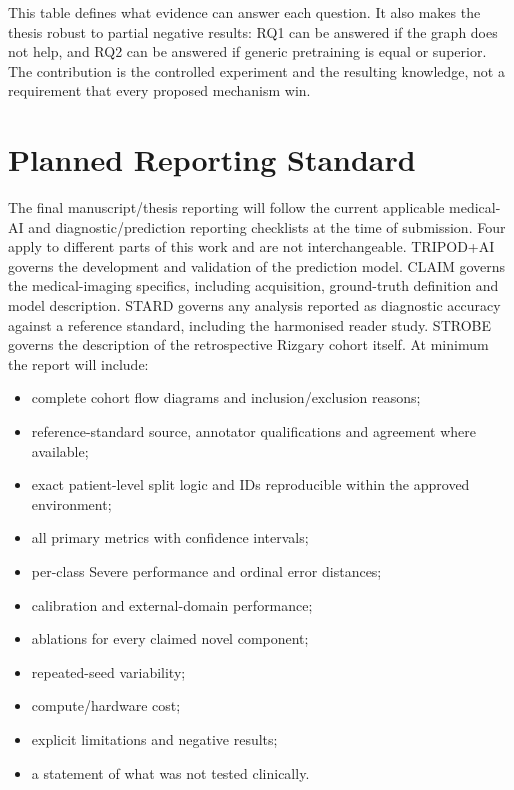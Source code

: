 This table defines what evidence can answer each question. It also makes the
thesis robust to partial negative results: RQ1 can be answered if the graph does
not help, and RQ2 can be answered if generic pretraining is equal or superior.
The contribution is the controlled experiment and the resulting knowledge, not
a requirement that every proposed mechanism win.

\section{Planned Reporting Standard}
\label{sec:method-reporting}

The final manuscript/thesis reporting will follow the current applicable
medical-AI and diagnostic/prediction reporting checklists at the time of
submission. Four apply to different parts of this work and are not
interchangeable. TRIPOD+AI \cite{collins2024tripodai} governs the development
and validation of the prediction model. CLAIM \cite{tejani2024checklist}
governs the medical-imaging specifics, including acquisition, ground-truth
definition and model description. STARD \cite{bossuyt2015stard} governs any
analysis reported as diagnostic accuracy against a reference standard,
including the harmonised reader study. STROBE
\cite{vonelm2007strengthening} governs the description of the retrospective
Rizgary cohort itself. At minimum the report will include:

\begin{itemize}
  \item complete cohort flow diagrams and inclusion/exclusion reasons;
  \item reference-standard source, annotator qualifications and agreement where
        available;
  \item exact patient-level split logic and IDs reproducible within the approved
        environment;
  \item all primary metrics with confidence intervals;
  \item per-class Severe performance and ordinal error distances;
  \item calibration and external-domain performance;
  \item ablations for every claimed novel component;
  \item repeated-seed variability;
  \item compute/hardware cost;
  \item explicit limitations and negative results;
  \item a statement of what was not tested clinically.
\end{itemize}

